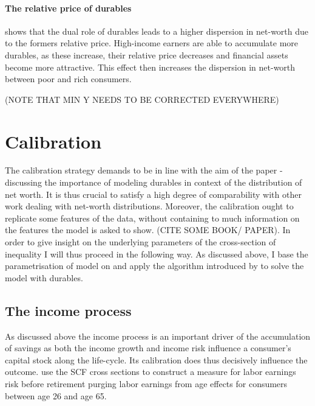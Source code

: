 \documentclass[a4paper,12pt,legno]{article}
\begin{document}
\paragraph{The relative price of durables} \citep{FV&K2011} shows that the dual role of durables leads to a higher dispersion in net-worth due to the formers relative price. High-income earners are able to accumulate more durables, as these increase, their relative price decreases and financial assets become more attractive. This effect then increases the dispersion in net-worth between poor and rich consumers. 

(NOTE THAT MIN Y NEEDS TO BE CORRECTED EVERYWHERE)


\section{Calibration}
The calibration strategy demands to be in line with the aim of the paper - discussing the importance of modeling durables in context of the distribution of net worth. It is thus crucial to satisfy a high degree of comparability with other work dealing with net-worth distributions. Moreover, the calibration ought to replicate some features of the data, without containing to much information on the features the model is asked to show. (CITE SOME BOOK/ PAPER). 
In order to give insight on the underlying parameters of the cross-section of inequality I will thus proceed in the following way. As discussed above, I base the parametrisation of model on \cite{hintermaier2011} and apply the algorithm introduced by \cite{hintermaier2010} to solve the model with durables. 

\subsection{The income process}
As discussed above the income process is an important driver of the accumulation of savings as both the income growth and income risk influence a consumer's capital stock along the life-cycle. Its calibration does thus decisively influence the outcome. 
\cite{hintermaier2011} use the SCF cross sections to construct a measure for labor earnings risk before retirement purging labor earnings from age effects for consumers between age 26 and age 65. 
\end{document}
